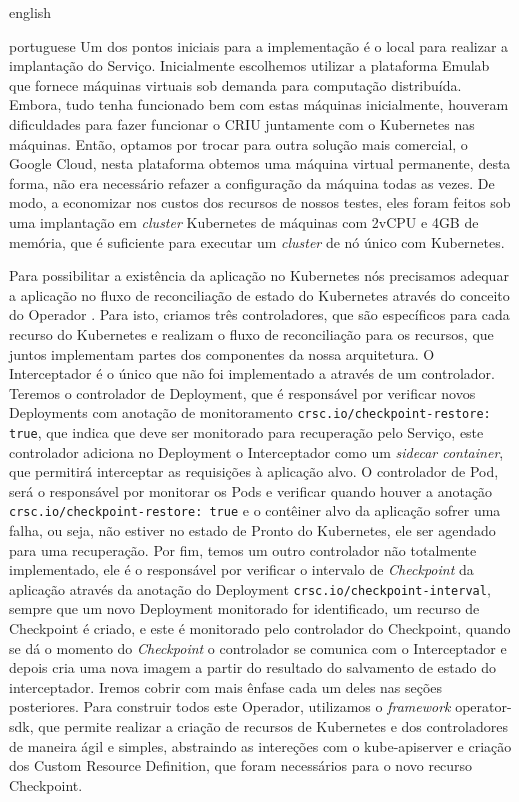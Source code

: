 \begin{otherlanguage*}{english}
\begin{otherlanguage*}{portuguese}
Um dos pontos iniciais para a implementação é o local para realizar a implantação do
Serviço. Inicialmente escolhemos utilizar a plataforma Emulab \cite{White+:osdi02}
que fornece máquinas virtuais sob demanda para computação distribuída. Embora, tudo
tenha funcionado bem com estas máquinas inicialmente, houveram dificuldades para
fazer funcionar o CRIU juntamente com o Kubernetes nas máquinas. Então, optamos por
trocar para outra solução mais comercial, o Google Cloud, nesta plataforma obtemos
uma máquina virtual permanente, desta forma, não era necessário refazer a configuração
da máquina todas as vezes. De modo, a economizar nos custos dos recursos de nossos testes,
eles foram feitos sob uma implantação em \textit{cluster} Kubernetes de máquinas com 2vCPU e 4GB
de memória, que é suficiente para executar um \textit{cluster} de nó único com Kubernetes.

Para possibilitar a existência da aplicação no Kubernetes nós precisamos adequar a
aplicação no fluxo de reconciliação de estado do Kubernetes através do conceito do Operador
\cite{kubernetes:operator}. Para isto, criamos três controladores, que são específicos para
cada recurso do Kubernetes e realizam o fluxo de reconciliação para os recursos, que juntos
implementam partes dos componentes da nossa arquitetura. O Interceptador é o único que não
foi implementado a através de um controlador. Teremos o controlador de Deployment, que é
responsável por verificar novos Deployments com anotação de monitoramento
\texttt{crsc.io/checkpoint-restore: true}, que indica que deve ser monitorado para
recuperação pelo Serviço, este controlador adiciona no Deployment o Interceptador como
um \textit{sidecar container}, que permitirá interceptar as requisições à aplicação alvo.
O controlador de Pod, será o responsável por monitorar os Pods e verificar quando houver a
anotação \texttt{crsc.io/checkpoint-restore: true} e o contêiner alvo da aplicação sofrer
uma falha, ou seja, não estiver no estado de Pronto do Kubernetes, ele ser agendado para
uma recuperação. Por fim, temos um outro controlador não totalmente
implementado, ele é o responsável por verificar o intervalo de \textit{Checkpoint} da
aplicação através da anotação do Deployment \texttt{crsc.io/checkpoint-interval}, sempre
que um novo Deployment monitorado for identificado, um recurso de Checkpoint é criado, e este
é monitorado pelo controlador do Checkpoint, quando se dá o momento do \textit{Checkpoint}
o controlador se comunica com o Interceptador e depois cria uma nova imagem a partir do
resultado do salvamento de estado do interceptador. Iremos cobrir com mais ênfase cada um
deles nas seções posteriores. Para construir todos este Operador, utilizamos o \textit{framework}
operator-sdk, que permite realizar a criação de recursos de Kubernetes e dos controladores
de maneira ágil e simples, abstraindo as intereções com o kube-apiserver e criação dos
Custom Resource Definition, que foram necessários para o novo recurso Checkpoint.


\end{otherlanguage*}
\end{otherlanguage*}
